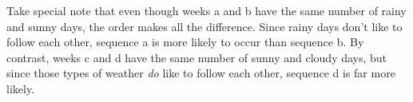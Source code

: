 \begin{alttitles}
\begin{compactenum}[a.]
\end{compactenum}

Take special note that even though weeks a and b have the same number of rainy
and sunny days, the order makes all the difference. Since rainy days don't like
to follow each other, sequence a is more likely to occur than sequence b. By
contrast, weeks c and d have the same number of sunny and cloudy days, but
since those types of weather \textit{do} like to follow each other, sequence d
is far more likely.

\label{markovPuzzleSol}


\end{alttitles}
